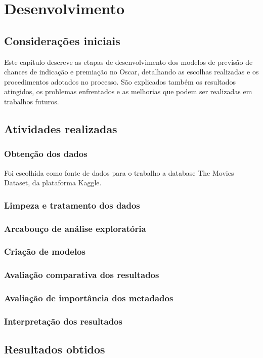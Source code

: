 

\chapter[Desenvolvimento]{Desenvolvimento}

    \section{Considerações iniciais}
    Este capítulo descreve as etapas de desenvolvimento dos modelos de previsão de chances de indicação e premiação no Oscar, detalhando as escolhas realizadas e os procedimentos adotados no processo. São explicados também os resultados atingidos, os problemas enfrentados e as melhorias que podem ser realizadas em trabalhos futuros.
    
    \section{Atividades realizadas}
    
        \subsection{Obtenção dos dados}
        Foi escolhida como fonte de dados para o trabalho a database The Movies Dataset, da plataforma Kaggle.\cite{kaggle2017}

        \subsection{Limpeza e tratamento dos dados}

        \subsection{Arcabouço de análise exploratória}

        \subsection{Criação de modelos}

        \subsection{Avaliação comparativa dos resultados}

        \subsection{Avaliação de importância dos metadados}

        \subsection{Interpretação dos resultados}

    \section{Resultados obtidos}


